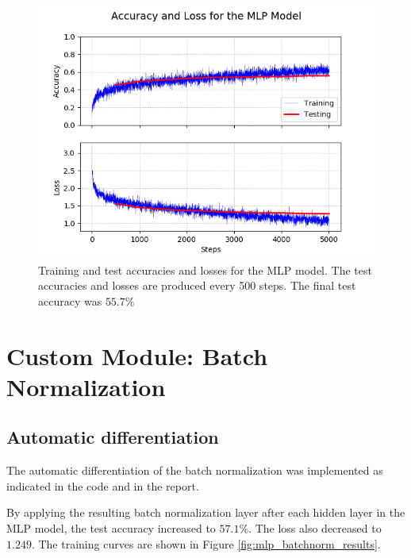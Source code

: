 \documentclass{article}
\begin{document}
\begin{figure}[h]
    \centering
    \includegraphics[scale=0.7]{img/mlp_results.png}
    \caption{Training and test accuracies and losses for the MLP model. The test accuracies and losses are produced every 500 steps. The final test accuracy was $55.7 \%$}
    \label{fig:mlp_results}
\end{figure}

\section{Custom Module: Batch Normalization}

\subsection{Automatic differentiation}

The automatic differentiation of the batch normalization was implemented as indicated in the code and in the report.

By applying the resulting batch normalization layer after each hidden layer in the MLP model, the test accuracy increased to $57.1 \%$. The loss also decreased to $1.249$. The training curves are shown in Figure \ref{fig:mlp_batchnorm_results}.
\end{document}
